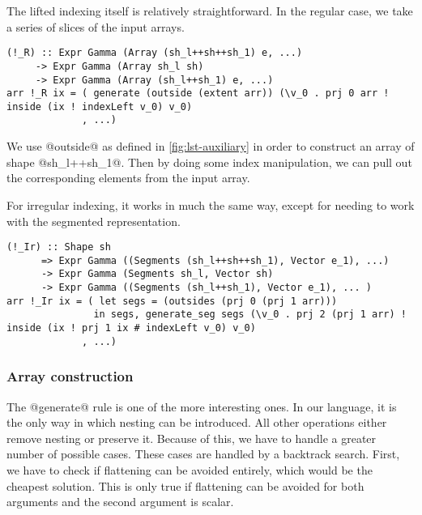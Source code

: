 The lifted indexing itself is relatively straightforward. In the regular case, we take a series of slices of the input arrays.
%
\begin{lstlisting}[style=ndp]
(!_R) :: Expr Gamma (Array (sh_l++sh++sh_1) e, ...)
     -> Expr Gamma (Array sh_l sh)
     -> Expr Gamma (Array (sh_l++sh_1) e, ...)
arr !_R ix = ( generate (outside (extent arr)) (\v_0 . prj 0 arr ! inside (ix ! indexLeft v_0) v_0)
             , ...)
\end{lstlisting}
%
We use @outside@ as defined in \ref{fig:lst-auxiliary} in order to construct an array of shape @sh_l++sh_1@. Then by doing some index manipulation, we can pull out the corresponding elements from the input array.

For irregular indexing, it works in much the same way, except for needing to work with the segmented representation.
%
\begin{lstlisting}[style=ndp]
(!_Ir) :: Shape sh
      => Expr Gamma ((Segments (sh_l++sh++sh_1), Vector e_1), ...)
      -> Expr Gamma (Segments sh_l, Vector sh)
      -> Expr Gamma ((Segments (sh_l++sh_1), Vector e_1), ... )
arr !_Ir ix = ( let segs = (outsides (prj 0 (prj 1 arr)))
               in segs, generate_seg segs (\v_0 . prj 2 (prj 1 arr) ! inside (ix ! prj 1 ix # indexLeft v_0) v_0)
             , ...)
\end{lstlisting}

\subsubsection{Array construction}
The @generate@ rule is one of the more interesting ones. In our language, it is the only way in which nesting can be introduced. All other operations either remove nesting or preserve it. Because of this, we have to handle a greater number of possible cases. These cases are handled by a backtrack search. First, we have to check if flattening can be avoided entirely, which would be the cheapest solution. This is only true if flattening can be avoided for both arguments and the second argument is scalar.

